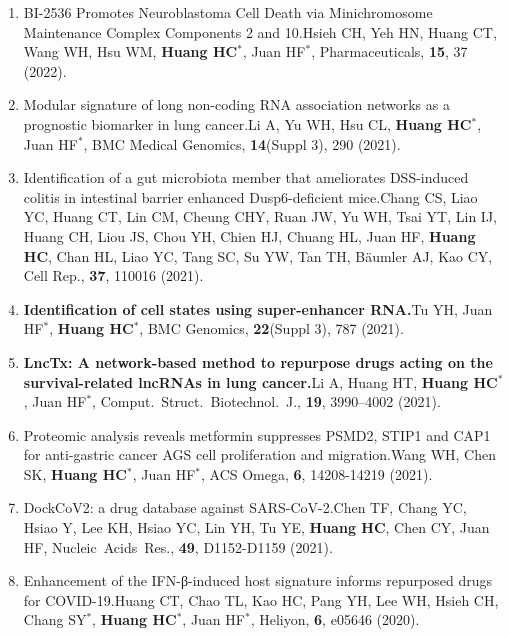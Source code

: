 \documentclass[10pt,a4paper]{article}
\def\mypub#1#2#3{{#1.}\newline #2, #3.}
\def\mybpub#1#2#3{{\boldmath \bf #1.}\newline #2, #3.}
\begin{document}
\begin{enumerate}
\item
\mypub{BI-2536 Promotes Neuroblastoma Cell Death via Minichromosome Maintenance Complex Components 2 and 10}
{Hsieh CH, Yeh HN, Huang CT, Wang WH, Hsu WM, {\bf Huang HC$^*$}, Juan HF$^*$}
{Pharmaceuticals, {\bf 15}, 37 (2022)}

\item
\mypub{Modular signature of long non-coding RNA association networks as a prognostic biomarker in lung cancer}
{Li A, Yu WH, Hsu CL, {\bf Huang HC$^*$}, Juan HF$^*$}
{BMC Medical Genomics, {\bf 14}(Suppl 3), 290 (2021)}

\item
\mypub{Identification of a gut microbiota member that ameliorates DSS-induced colitis in intestinal barrier enhanced Dusp6-deficient mice}
{Chang CS, Liao YC, Huang CT, Lin CM, Cheung CHY, Ruan JW, Yu WH, Tsai YT, Lin IJ, Huang CH, Liou JS, Chou YH, Chien HJ, Chuang HL, Juan HF, {\bf Huang HC}, Chan HL, Liao YC, Tang SC, Su YW, Tan TH, Bäumler AJ, Kao CY}
{Cell Rep., {\bf 37}, 110016 (2021)}

\item
\mybpub{Identification of cell states using super-enhancer RNA}
{Tu YH, Juan HF$^*$, {\bf Huang HC$^*$}}
{BMC Genomics, {\bf 22}(Suppl 3), 787 (2021)}

\item
\mybpub{LncTx: A network-based method to repurpose drugs acting on the survival-related lncRNAs in lung cancer}
{Li A, Huang HT, {\bf Huang HC$^*$}, Juan HF$^*$}
{Comput.\ Struct.\ Biotechnol.\ J., {\bf 19}, 3990–4002 (2021)}

\item
\mypub{Proteomic analysis reveals metformin suppresses PSMD2, STIP1 and CAP1 for anti-gastric cancer AGS cell proliferation and migration}
{Wang WH, Chen SK, {\bf Huang HC$^*$}, Juan HF$^*$}
{ACS Omega, {\bf 6}, 14208-14219 (2021)}

\item
\mypub{DockCoV2: a drug database against SARS-CoV-2}
{Chen TF, Chang YC, Hsiao Y, Lee KH, Hsiao YC, Lin YH, Tu YE, {\bf Huang HC}, Chen CY, Juan HF}
{Nucleic\ Acids\ Res.,  {\bf 49}, D1152-D1159 (2021)}

\item
\mypub{Enhancement of the IFN-β-induced host signature informs repurposed drugs for COVID-19}
{Huang CT, Chao TL, Kao HC, Pang YH, Lee WH, Hsieh CH, Chang SY$^*$, {\bf Huang HC$^*$}, Juan HF$^*$}
{Heliyon, {\bf 6}, e05646 (2020)}


\end{enumerate}
\end{document}
